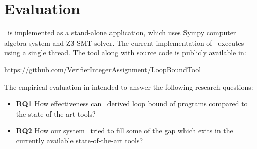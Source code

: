 \section{Evaluation}
\label{sec:evaluation}

\SystemName\ is implemented  as a stand-alone application, which uses Sympy \cite{joyner2012open} computer algebra system  and Z3 \cite{de2008z3} SMT solver.
The current implementation of \SystemName\ executes using a single thread. The tool along with source code is  publicly available  in:

\url{https://github.com/VerifierIntegerAssignment/LoopBoundTool}

The empirical evaluation in intended to answer the following research questions:
\begin{itemize} 
	\item \textbf{RQ1} How effectiveness can \SystemName\ derived loop bound of programs compared to the state-of-the-art tools? 
	\item \textbf{RQ2} How our system \SystemName\ tried to fill some of the gap which exits in the currently available state-of-the-art tools?
\end{itemize}

